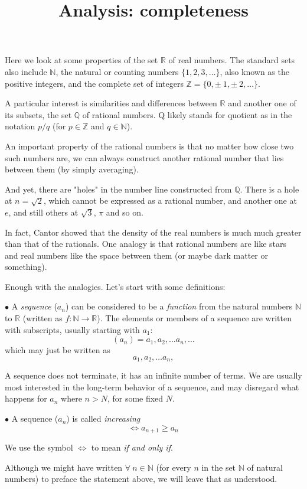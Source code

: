 \documentclass[11pt, oneside]{article}   	%
\title{Analysis:  completeness}
\date{}							%
\begin{document}
\maketitle
\Large
Here we look at some properties of the set $\mathbb{R}$ of real numbers.  The standard sets also include $\mathbb{N}$, the natural or counting numbers $\{1,2,3, \dots\}$, also known as the positive integers, and the complete set of integers $\mathbb{Z} = \{0, \pm \ 1, \pm \ 2, \dots\}$.

A particular interest is similarities and differences between $\mathbb{R}$ and another one of its subsets, the set $\mathbb{Q}$ of rational numbers.  Q likely stands for quotient as in the notation $p/q$ (for $p \in \mathbb{Z}$ and $q \in \mathbb{N}$).

An important property of the rational numbers is that no matter how close two such numbers are, we can always construct another rational number that lies between them (by simply averaging).  

And yet, there are "holes" in the number line constructed from $\mathbb{Q}$.  There is a hole at $n=\sqrt{2}$, which cannot be expressed as a rational number, and another one at $e$, and still others at $\sqrt{3}$, $\pi$ and so on.

In fact, Cantor showed that the density of the real numbers is much much greater than that of the rationals.  One analogy is that rational numbers are like stars and real numbers like the space between them (or maybe dark matter or something).

Enough with the analogies.  Let's start with some definitions:

$\bullet$  A \emph{sequence} ($a_n$) can be considered to be a \emph{function} from the natural numbers $\mathbb{N}$ to $\mathbb{R}$ (written as $f: \mathbb{N} \rightarrow \mathbb{R}$).  The elements or members of a sequence are written with subscripts, usually starting with $a_1$:
\[ (a_n) = a_1, a_2, \dots a_n, \dots\]
which may just be written as
\[ a_1, a_2, \dots a_n, \]

A sequence does not terminate, it has an infinite number of terms.  We are usually most interested in the long-term behavior of a sequence, and may disregard what happens for $a_n$ where $n > N$, for some fixed $N$.

$\bullet$  A sequence ($a_n$) is called \emph{increasing}
\[ \iff a_{n+1} \ge a_n \]

We use the symbol $\iff$ to mean \emph{if and only if}.

Although we might have written $\forall \ n \in \mathbb{N}$ (for every $n$ in the set $\mathbb{N}$ of natural numbers) to preface the statement above, we will leave that as understood.
\end{document}
